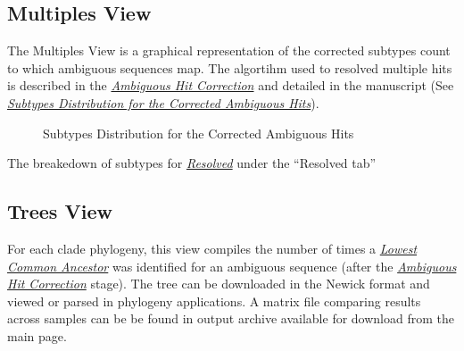 \documentclass[letterpaper,10pt,english]{sphinxmanual}
\begin{document}
\subsection{Multiples View}
\label{Web:multiples-view}
The Multiples View is a graphical representation of the corrected subtypes
count to which ambiguous sequences map. The algortihm used to
resolved multiple hits is described in the {\hyperref[defs:multiple-hits]{\emph{Ambiguous Hit Correction}}} and
detailed in the manuscript (See {\hyperref[Web:multiplesview]{\emph{Subtypes Distribution for the Corrected Ambiguous Hits}}}).
\begin{figure}[htbp]
\centering
\capstart

\caption{Subtypes Distribution for the Corrected Ambiguous Hits}\label{Web:multiplesview}\end{figure}

The breakedown of subtypes for {\hyperref[defs:resolved]{\emph{Resolved}}} under the ``Resolved tab''


\subsection{Trees View}
\label{Web:trees-view}
For each clade phylogeny, this view compiles the number of times a {\hyperref[defs:lca]{\emph{Lowest Common Ancestor}}}
was identified for an ambiguous sequence (after the {\hyperref[defs:multiple-hits]{\emph{Ambiguous Hit Correction}}} stage).
The tree can be downloaded in the Newick format and viewed or parsed in phylogeny
applications. A matrix file comparing results across samples can be be found in
output archive available for download from the main page.
\end{document}
